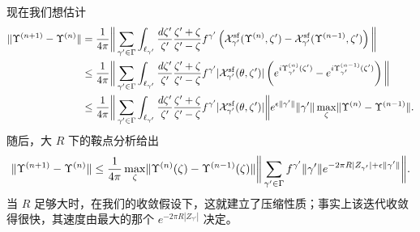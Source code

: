 现在我们想估计
\begin{align}
\lVert \Upsilon^{(n+1)}-\Upsilon^{(n)} \rVert &=
\frac{1}{4 \pi} \bigg\lVert \sum_{\gamma' \in \Gamma} \int_{\ell_{\gamma'}}
\frac{d\zeta'}{\zeta'} \frac{\zeta' + \zeta}{\zeta' - \zeta}
f^{\gamma'}\left(\mathcal{X}^{\mathrm{sf}}_{\gamma'}(\Upsilon^{(n)},\zeta')-\mathcal{X}^{\mathrm{sf}}_{\gamma'}(\Upsilon^{(n-1)},\zeta')\right) \bigg\rVert \\
&\le \frac{1}{4 \pi}\bigg\lVert \sum_{\gamma' \in \Gamma} \int_{\ell_{\gamma'}}
\frac{d\zeta'}{\zeta'} \frac{\zeta' + \zeta}{\zeta' - \zeta}
f^{\gamma'} \lvert \mathcal{X}^{\mathrm{sf}}_{\gamma'}(\theta, \zeta') \rvert \left(e^{i \Upsilon^{(n)}_{
\gamma'}(\zeta')} - e^{i \Upsilon^{(n-1)}_{\gamma'}(\zeta')}\right) \bigg\rVert \\
&\le \frac{1}{4 \pi}\bigg\lVert \sum_{\gamma' \in \Gamma} \int_{\ell_{\gamma'}}
\frac{d\zeta'}{\zeta'} \frac{\zeta' + \zeta}{\zeta' - \zeta}
f^{\gamma'} \lvert \mathcal{X}^{\mathrm{sf}}_{\gamma'}(\theta, \zeta') \rvert  \bigg\rVert e^{\epsilon \lVert \gamma' \rVert} \lVert \gamma' \rVert \max_{\zeta}  \lVert \Upsilon^{(n)} -
\Upsilon^{(n-1)} \rVert.
\end{align}
随后，大 $R$ 下的鞍点分析给出
\begin{equation}
\lVert \Upsilon^{(n+1)}-\Upsilon^{(n)} \rVert \le
\frac{1}{4\pi}\max_{\zeta} \lVert \Upsilon^{(n)}(\zeta) -
\Upsilon^{(n-1)}(\zeta) \rVert \bigg\lVert \sum_{\gamma' \in \Gamma}
f^{\gamma'} \lVert \gamma' \rVert e^{- 2 \pi R |Z_{\gamma'}| + \epsilon
\lVert \gamma' \rVert} \bigg\rVert.
\end{equation}
当 $R$ 足够大时，在我们的收敛假设下，这就建立了压缩性质；事实上该迭代收敛得很快，其速度由最大的那个 $e^{- 2 \pi R |Z_{\gamma'}|}$ 决定。

